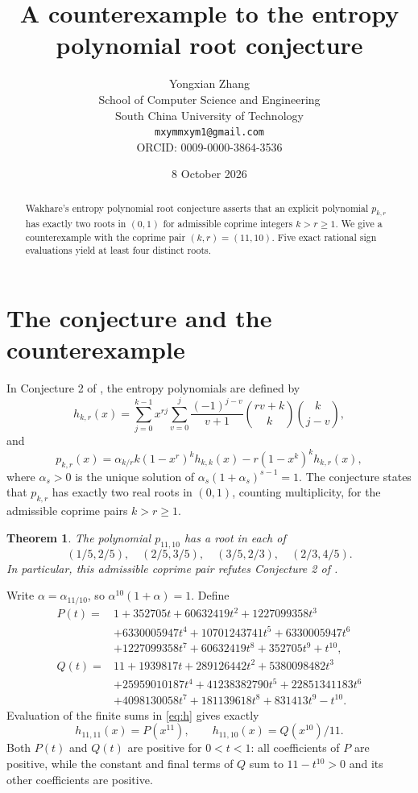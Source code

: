 \documentclass[11pt]{article}
\title{A counterexample to the entropy polynomial root conjecture}
\author{Yongxian Zhang\\[2pt]\small School of Computer Science and Engineering\\\small South China University of Technology\\\small\texttt{mxymmxym1@gmail.com}\\\small ORCID: 0009-0000-3864-3536}
\date{8 October 2026}
\newtheorem{theorem}{Theorem}
\begin{document}
\maketitle
\vspace{-1.8em}
\begin{abstract}
Wakhare's entropy polynomial root conjecture asserts that an explicit polynomial
$p_{k,r}$ has exactly two roots in $(0,1)$ for admissible coprime
integers $k>r\geq1$.
We give a counterexample with the coprime pair $(k,r)=(11,10)$.
Five exact rational sign evaluations yield at least four distinct roots.
\end{abstract}

\section{The conjecture and the counterexample}
In Conjecture 2 of \cite{Wakhare}, the entropy polynomials are defined by
\begin{equation}\label{eq:h}
h_{k,r}(x)=\sum_{j=0}^{k-1}x^{rj}
 \sum_{v=0}^{j}\frac{(-1)^{j-v}}{v+1}
 \binom{rv+k}{k}\binom{k}{j-v},
\end{equation}
and
\begin{equation}\label{eq:p}
p_{k,r}(x)=\alpha_{k/r}k(1-x^r)^k h_{k,k}(x)
-r(1-x^k)^k h_{k,r}(x),
\end{equation}
where $\alpha_s>0$ is the unique solution of
$\alpha_s(1+\alpha_s)^{s-1}=1$.
The conjecture states that $p_{k,r}$ has exactly two real roots in $(0,1)$,
counting multiplicity, for the admissible coprime pairs $k>r\ge1$.

\begin{theorem}\label{thm:counter}
The polynomial $p_{11,10}$ has a root in each of
\[
(1/5,2/5),\quad (2/5,3/5),\quad (3/5,2/3),\quad (2/3,4/5).
\]
In particular, this admissible coprime pair refutes Conjecture 2
of \cite{Wakhare}.
\end{theorem}

Write $\alpha=\alpha_{11/10}$, so $\alpha^{10}(1+\alpha)=1$.
Define
\begin{align*}
P(t)={}&1+352705t+60632419t^2+1227099358t^3\\
 &+6330005947t^4+10701243741t^5+6330005947t^6\\
 &+1227099358t^7+60632419t^8+352705t^9+t^{10},\\[3pt]
Q(t)={}&11+1939817t+289126442t^2+5380098482t^3\\
 &+25959010187t^4+41238382790t^5+22851341183t^6\\
 &+4098130058t^7+181139618t^8+831413t^9-t^{10}.
\end{align*}
Evaluation of the finite sums in \eqref{eq:h} gives exactly
\begin{equation}\label{eq:coeff}
h_{11,11}(x)=P(x^{11}),\qquad h_{11,10}(x)=Q(x^{10})/11.
\end{equation}
Both $P(t)$ and $Q(t)$ are positive for $0<t<1$: all coefficients of $P$ are
positive, while the constant and final terms of $Q$ sum to $11-t^{10}>0$
and its other coefficients are positive.
\end{document}
